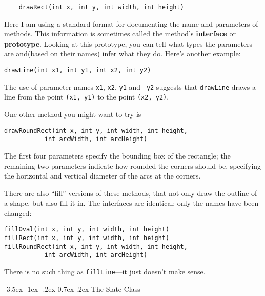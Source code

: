 \documentclass{book}
\makeatletter
\renewcommand{\section}{\@startsection 
    {section} {1} {0mm}%
    {-3.5ex \@plus -1ex \@minus -.2ex}%
    {0.7ex \@plus.2ex}%
    {\normalfont\Large\bfseries}}
\makeatother
\begin{document}
\begin{verbatim}
    drawRect(int x, int y, int width, int height)
\end{verbatim}
%
Here I am using a standard format for documenting the name
and parameters of methods.  This information is sometimes
called the method's {\bf interface} or {\bf prototype}.
Looking at this prototype, you can tell what types the
parameters are and(based on their names) infer what they
do.  Here's another example:

\begin{verbatim}
drawLine(int x1, int y1, int x2, int y2)
\end{verbatim}
%
The use of parameter names {\tt x1}, {\tt x2}, {\tt y1} and {\tt
y2} suggests that {\tt drawLine} draws a line from the
point {\tt(x1, y1)} to the point {\tt(x2, y2)}.

One other method you might want to try is

\begin{verbatim}
drawRoundRect(int x, int y, int width, int height,
	       int arcWidth, int arcHeight)
\end{verbatim}
%
The first four parameters specify the bounding box of
the rectangle; the remaining two parameters indicate
how rounded the corners should be, specifying the
horizontal and vertical diameter of the arcs at the
corners.

There are also ``fill'' versions of these methods, that not
only draw the outline of a shape, but also fill it in.
The interfaces are identical; only the names have been
changed:

\begin{verbatim}
fillOval(int x, int y, int width, int height)
fillRect(int x, int y, int width, int height)
fillRoundRect(int x, int y, int width, int height,
	       int arcWidth, int arcHeight)
\end{verbatim}
%
There is no such thing as {\tt fillLine}---it just doesn't
make sense.


\section{The Slate Class}
\label{slate}
\end{document}
